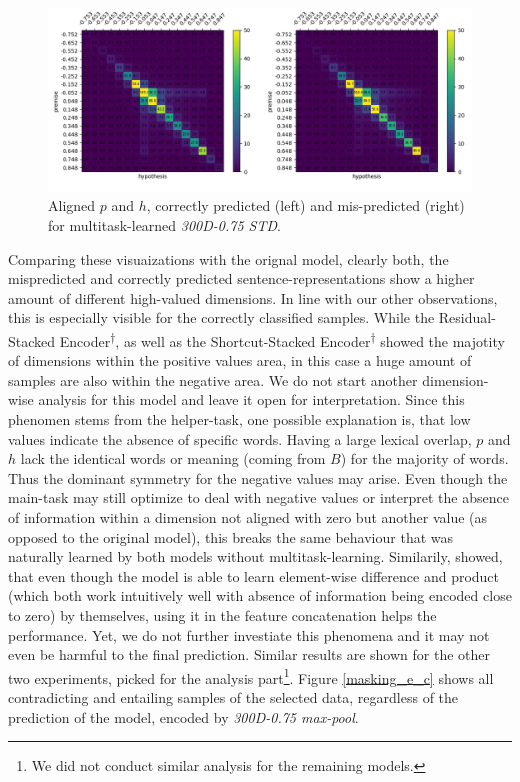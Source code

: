 \begin{figure}[tph!]
\centering
	\includegraphics[totalheight=7cm]{fig/300d75_correct_incorrect_c.png}
	\caption{Aligned $p$ and $h$, correctly predicted (left) and mis-predicted (right) for multitask-learned \textit{300D-0.75 STD}.}
	\label{fig:300d75_correct_incorrect_c}
\end{figure}
Comparing these visuaizations with the orignal model, clearly both, the mispredicted and correctly predicted sentence-representations show a higher amount of different high-valued dimensions. In line with our other observations, this is especially visible for the correctly classified samples. While the Residual-Stacked Encoder\textsuperscript{$\dagger$}, as well as the Shortcut-Stacked Encoder\textsuperscript{$\dagger$} showed the majotity of dimensions within the positive values area, in this case a huge amount of samples are also within the negative area. We do not start another dimension-wise analysis for this model and leave it open for interpretation. Since this phenomen stems from the helper-task, one possible explanation is, that low values indicate the absence of specific words. Having a large lexical overlap, $p$ and $h$ lack the identical words or meaning (coming from $B$) for the majority of words. Thus the dominant symmetry for the negative values may arise. Even though the main-task may still optimize to deal with negative values or interpret the absence of information within a dimension not aligned with zero but another value (as opposed to the original model), this breaks the same behaviour that was naturally learned by both models without multitask-learning. Similarily, \cite{mou2015natural} showed, that even though the model is able to learn element-wise difference and product (which both work intuitively well with absence of information being encoded close to zero) by themselves, using it in the feature concatenation helps the performance. Yet, we do not further investiate this phenomena and it may not even be harmful to the final prediction. Similar results are shown for the other two experiments, picked for the analysis part\footnote{We did not conduct similar analysis for the remaining models.}. Figure \ref{masking_e_c} shows all contradicting and entailing samples of the selected data, regardless of the prediction of the model, encoded by \textit{300D-0.75 max-pool}.
